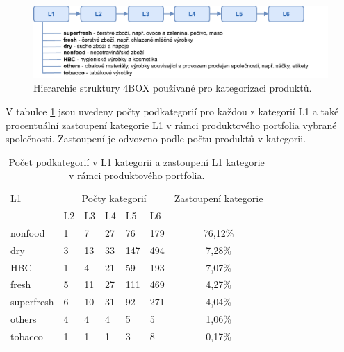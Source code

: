 \begin{figure}[hbtp!]
    \centering
    \includegraphics[width=\textwidth]{obrazky/4box.pdf}
    \caption{Hierarchie struktury 4BOX používané pro kategorizaci produktů.}
    \label{obr:d:4box}
\end{figure}

V tabulce \ref*{tab:d:4Bzast} jsou uvedeny počty podkategorií pro každou z kategorií L1 a také procentuální zastoupení kategorie L1 v rámci produktového portfolia vybrané společnosti. Zastoupení je odvozeno podle počtu produktů v kategorii.

\begin{table}[hbtp!]
    \captionsetup{justification=centering}
    \begin{center}
    \caption{Počet podkategorií v L1 kategorii a zastoupení L1 kategorie \\ v rámci produktového portfolia.}
    \label{tab:d:4Bzast}
    \begin{tabular}{p{3cm}  p{1cm} p{1cm} p{1cm} p{1cm} p{1cm}  c}
        L1 & \multicolumn{5}{c}{Počty kategorií} &      Zastoupení kategorie                \\
                & L2    & L3   & L4   & L5    & L6    &  \\
        \hline
        nonfood    & 1     & 7    & 27   & 76    & 179   & 76,12\%              \\
        dry         & 3     & 13   & 33   & 147   & 494   & 7,28\%               \\
        HBC        & 1     & 4    & 21   & 59    & 193   & 7,07\%               \\
        fresh       & 5     & 11   & 27   & 111   & 469   & 4,27\%               \\
        superfresh & 6     & 10   & 31   & 92    & 271   & 4,04\%               \\
        others     & 4     & 4    & 4    & 5     & 5     & 1,06\%               \\
        tobacco    & 1     & 1    & 1    & 3     & 8     & 0,17\%            
    \end{tabular}
    \end{center}
    \end{table}

